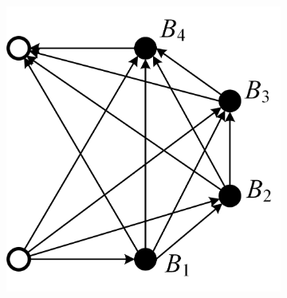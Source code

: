 \documentclass{article}
\begin{document}
\begin{figure}[htbp]
    \centering
    \begin{subfigure}[b]{0.31\textwidth}
        \includegraphics[width=\textwidth]{direct-graph-he.png}
        \caption{}
        \label{fig:direct-graph-he}
    \end{subfigure}
    \hspace{0.02\textwidth}
    \begin{subfigure}[b]{0.23\textwidth}

\end{subfigure}
\end{figure}
\end{document}
